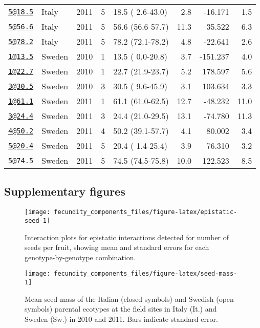 \documentclass[]{article}
\begin{document}
\begin{longtable}[]{@{}llrrlrrr@{}}
\href{mailto:5@18.5}{\nolinkurl{5@18.5}} & Italy & 2011 & 5 & 18.5 ( 2.6-43.0) & 2.8 & -16.171 & 1.5\tabularnewline
\href{mailto:5@56.6}{\nolinkurl{5@56.6}} & Italy & 2011 & 5 & 56.6 (56.6-57.7) & 11.3 & -35.522 & 6.3\tabularnewline
\href{mailto:5@78.2}{\nolinkurl{5@78.2}} & Italy & 2011 & 5 & 78.2 (72.1-78.2) & 4.8 & -22.641 & 2.6\tabularnewline
\href{mailto:1@13.5}{\nolinkurl{1@13.5}} & Sweden & 2010 & 1 & 13.5 ( 0.0-20.8) & 3.7 & -151.237 & 4.0\tabularnewline
\href{mailto:1@22.7}{\nolinkurl{1@22.7}} & Sweden & 2010 & 1 & 22.7 (21.9-23.7) & 5.2 & 178.597 & 5.6\tabularnewline
\href{mailto:3@30.5}{\nolinkurl{3@30.5}} & Sweden & 2010 & 3 & 30.5 ( 9.6-45.9) & 3.1 & 103.634 & 3.3\tabularnewline
\href{mailto:1@61.1}{\nolinkurl{1@61.1}} & Sweden & 2011 & 1 & 61.1 (61.0-62.5) & 12.7 & -48.232 & 11.0\tabularnewline
\href{mailto:3@24.4}{\nolinkurl{3@24.4}} & Sweden & 2011 & 3 & 24.4 (21.0-29.5) & 13.1 & -74.780 & 11.3\tabularnewline
\href{mailto:4@50.2}{\nolinkurl{4@50.2}} & Sweden & 2011 & 4 & 50.2 (39.1-57.7) & 4.1 & 80.002 & 3.4\tabularnewline
\href{mailto:5@20.4}{\nolinkurl{5@20.4}} & Sweden & 2011 & 5 & 20.4 ( 1.4-25.4) & 3.9 & 76.310 & 3.2\tabularnewline
\href{mailto:5@74.5}{\nolinkurl{5@74.5}} & Sweden & 2011 & 5 & 74.5 (74.5-75.8) & 10.0 & 122.523 & 8.5\tabularnewline
\bottomrule
\end{longtable}

\newpage

\hypertarget{supplementary-figures}{%
\subsection{Supplementary figures}\label{supplementary-figures}}

\begin{figure}

{\centering \texttt{[image: fecundity\_components\_files/figure-latex/epistatic-seed-1]} 

}

\caption[Epistatic interactions for seeds/fruit]{Interaction plots for epistatic interactions detected for number of seeds per fruit, showing mean and standard errors for each genotype-by-genotype combination.}\label{fig:epistatic-seed}
\end{figure}

\newpage

\begin{figure}

{\centering \texttt{[image: fecundity\_components\_files/figure-latex/seed-mass-1]} 

}

\caption[Seed mass among parental lines]{Mean seed mass of the Italian (closed symbols) and Swedish (open symbols) parental ecotypes at the field sites in Italy (It.) and Sweden (Sw.) in 2010 and 2011. Bars indicate standard error.}\label{fig:seed-mass}
\end{figure}
\end{document}

